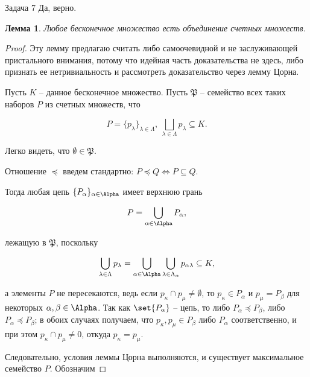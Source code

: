 \documentclass{article}
\newtheorem{lemma}{Лемма}
\begin{document}
	\begin{section}{Задача 7}
		Да, верно.

		\begin{lemma}
			Любое бесконечное множество есть объединение счетных множеств.
		\end{lemma}

		\begin{proof}
			Эту лемму предлагаю считать либо самоочевидной и не заслуживающей пристального внимания, потому что идейная часть доказательства не здесь, либо признать ее нетривиальность и рассмотреть доказательство через лемму Цорна.

			Пусть $K$ -- данное бесконечное множество. Пусть $\mathfrak{P}$ -- семейство всех таких наборов $P$ из счетных множеств, что

			\begin{equation*}
				P = \{p_\lambda\}_{\lambda \in \Lambda}, \ \bigsqcup_{\lambda \in \Lambda} p_\lambda \subseteq K.
			\end{equation*}

			Легко видеть, что $\emptyset \in \mathfrak{P}$.

			Отношение $\preceq$ введем стандартно: $P \preceq Q \iff P \subseteq Q$.

			Тогда любая цепь $\{P_\alpha\}_{\alpha \in \Alpha}$ имеет верхнюю грань

			\begin{equation*}
				P = \bigcup_{\alpha \in \Alpha} P_\alpha,
			\end{equation*}

			лежащую в $\mathfrak{P}$, поскольку

			\begin{equation*}
				\bigcup_{\lambda \in \Lambda} p_\lambda = \bigcup_{\alpha \in \Alpha} \bigcup_{\lambda \in \Lambda_\alpha} p_{\alpha \lambda} \subseteq K,
			\end{equation*}

			а элементы $P$ не пересекаются, ведь если $p_\kappa \cap p_\mu \ne \emptyset$, то $p_\kappa \in P_\alpha$ и $p_\mu = P_\beta$ для некоторых $\alpha, \beta \in \Alpha$. Так как $\set{P_\alpha}$ -- цепь, то либо $P_\alpha \preceq P_\beta$, либо $P_\alpha \preceq P_\beta$; в обоих случаях получаем, что $p_\kappa, p_\mu \in P_\beta$ либо $P_\alpha$ соответственно, и при этом $p_\kappa \cap p_\mu \ne 0$, откуда $p_\kappa = p_\mu$.

			Следовательно, условия леммы Цорна выполняются, и существует максимальное семейство $P$. Обозначим


\end{proof}
\end{section}
\end{document}
